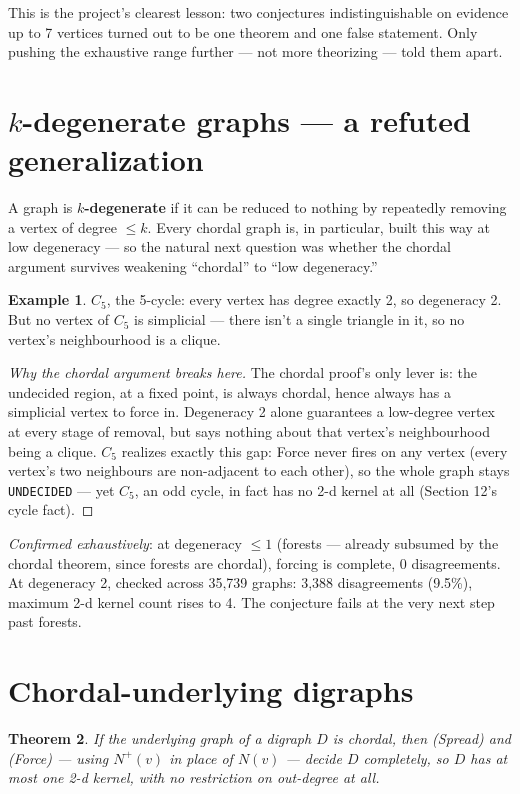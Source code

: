 \documentclass[11pt]{article}
\theoremstyle{plain}
\newtheorem{theorem}{Theorem}
\theoremstyle{definition}
\newtheorem{example}[theorem]{Example}
\theoremstyle{remark}
\begin{document}
This is the project's clearest lesson: two conjectures indistinguishable on evidence
up to 7 vertices turned out to be one theorem and one false statement. Only pushing
the exhaustive range further — not more theorizing — told them apart.

\section{$k$-degenerate graphs — a refuted generalization}

A graph is \textbf{$k$-degenerate} if it can be reduced to nothing by repeatedly
removing a vertex of degree $\le k$. Every chordal graph is, in particular, built
this way at low degeneracy — so the natural next question was whether the chordal
argument survives weakening ``chordal'' to ``low degeneracy.''

\begin{example}
$C_5$, the 5-cycle: every vertex has degree exactly 2, so degeneracy 2. But no
vertex of $C_5$ is simplicial — there isn't a single triangle in it, so no vertex's
neighbourhood is a clique.
\end{example}

\begin{proof}[Why the chordal argument breaks here]
The chordal proof's only lever is: the undecided region, at a fixed point, is always
chordal, hence always has a simplicial vertex to force in. Degeneracy 2 alone
guarantees a low-degree vertex at every stage of removal, but says nothing about
that vertex's neighbourhood being a clique. $C_5$ realizes exactly this gap: Force
never fires on any vertex (every vertex's two neighbours are non-adjacent to each
other), so the whole graph stays \texttt{UNDECIDED} — yet $C_5$, an odd cycle, in
fact has no 2-d kernel at all (Section 12's cycle fact).
\end{proof}

\emph{Confirmed exhaustively}: at degeneracy $\le1$ (forests — already subsumed by
the chordal theorem, since forests are chordal), forcing is complete, 0
disagreements. At degeneracy 2, checked across 35{,}739 graphs: 3{,}388 disagreements
(9.5\%), maximum 2-d kernel count rises to 4. The conjecture fails at the very next
step past forests.

\section{Chordal-underlying digraphs}

\begin{theorem}
If the underlying graph of a digraph $D$ is chordal, then (Spread) and (Force) —
using $N^+(v)$ in place of $N(v)$ — decide $D$ completely, so $D$ has at most one
2-d kernel, with no restriction on out-degree at all.
\end{theorem}
\end{document}
